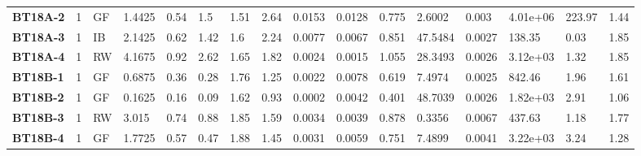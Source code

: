 \begin{table}
{\begin{tabular}{l|c|l|l|l|l|l|l|l|l|l|l|l|l|l|l}
    \bfseries BT18A-2 & 1 & GF & 1.4425 & 0.54 & 1.5 & 1.51 & 2.64 & 0.0153 & 0.0128 & 0.775 & 2.6002 & 0.003 & 4.01e+06 & 223.97 & 1.44 \\
    \bfseries BT18A-3 & 1 & IB & 2.1425 & 0.62 & 1.42 & 1.6 & 2.24 & 0.0077 & 0.0067 & 0.851 & 47.5484 & 0.0027 & 138.35 & 0.03 & 1.85 \\
    \bfseries BT18A-4 & 1 & RW & 4.1675 & 0.92 & 2.62 & 1.65 & 1.82 & 0.0024 & 0.0015 & 1.055 & 28.3493 & 0.0026 & 3.12e+03 & 1.32 & 1.85 \\
    \hline
    \bfseries BT18B-1 & 1 & GF & 0.6875 & 0.36 & 0.28 & 1.76 & 1.25 & 0.0022 & 0.0078 & 0.619 & 7.4974 & 0.0025 & 842.46 & 1.96 & 1.61 \\
    \bfseries BT18B-2 & 1 & GF & 0.1625 & 0.16 & 0.09 & 1.62 & 0.93 & 0.0002 & 0.0042 & 0.401 & 48.7039 & 0.0026 & 1.82e+03 & 2.91 & 1.06 \\
    \bfseries BT18B-3 & 1 & RW & 3.015 & 0.74 & 0.88 & 1.85 & 1.59 & 0.0034 & 0.0039 & 0.878 & 0.3356 & 0.0067 & 437.63 & 1.18 & 1.77 \\
    \bfseries BT18B-4 & 1 & GF & 1.7725 & 0.57 & 0.47 & 1.88 & 1.45 & 0.0031 & 0.0059 & 0.751 & 7.4899 & 0.0041 & 3.22e+03 & 3.24 & 1.28 \\


\end{tabular}}
\end{table} 

